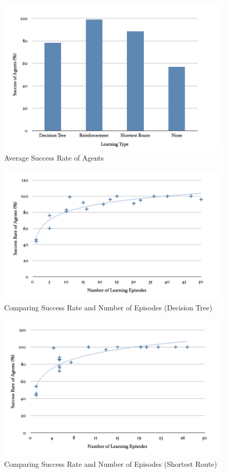 \documentclass[a4paper,oneside]{report}
\begin{document}
\begin{figure}[H]
  \centering
    \includegraphics[width=130mm]{sources/images/AvgSuccess}
    \caption{Average Success Rate of Agents}
    \label{fig:AvgSuccess}
\end{figure}

\begin{figure}[H]
  \centering
    \includegraphics[width=130mm]{sources/images/SE_Tree}
    \caption{Comparing Success Rate and Number of Episodes (Decision Tree)}
    \label{fig:SE_Tree}
\end{figure}

\begin{figure}[H]
  \centering
    \includegraphics[width=130mm]{sources/images/SE_SR}
    \caption{Comparing Success Rate and Number of Episodes (Shortest Route)}
    \label{fig:SE_SR}
\end{figure}
\end{document}
